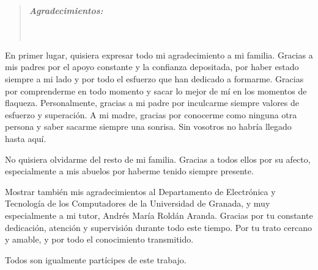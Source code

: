 \cleardoublepage
{}
{}

\vspace*{2.5cm}


\begin{quotation}
\noindent \begin{center}
\textbf{\emph{\Large Agradecimientos:}}\textbf{\emph{\large }}\\
\textbf{\emph{\large }}\\
\textbf{\emph{\large }}\\
\textbf{\emph{\large }}
\par\end{center}{\large \par}
\end{quotation}

\begin{onehalfspace}

En primer lugar, quisiera expresar todo mi agradecimiento a mi familia. Gracias a mis padres por el apoyo constante y la confianza depositada, por haber estado siempre a mi lado y por todo el esfuerzo que han dedicado a formarme. Gracias por comprenderme en todo momento y sacar lo mejor de mí en los momentos de flaqueza. Personalmente, gracias a mi padre por inculcarme siempre valores de esfuerzo y superación. A mi madre, gracias por conocerme como ninguna otra persona y saber sacarme siempre una sonrisa. Sin vosotros no habría llegado hasta aquí.


No quisiera olvidarme del resto de mi familia. Gracias a todos ellos por su afecto, especialmente a mis abuelos por haberme tenido siempre presente.

Mostrar también mis agradecimientos al Departamento de Electrónica y Tecnología de los Computadores de la Universidad de Granada, y muy especialmente a mi tutor, Andrés María Roldán Aranda. Gracias por tu constante dedicación, atención y supervisión durante todo este tiempo. Por tu trato cercano y amable, y por todo el conocimiento transmitido.



\end{onehalfspace}

\bigskip

Todos son igualmente partícipes de este trabajo.

\clearpage{\pagestyle{empty}\cleardoublepage}%
